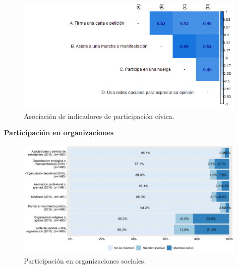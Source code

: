 \documentclass[
  12pt,
]{book}
\begin{document}
\begin{figure}[H]

{\centering \includegraphics[width=1\linewidth,height=1\textheight]{output/graphs/participacion-civica_cor} 

}

\caption{Asociación de indicadores de participación cívica.}\label{fig:participacion-civica-cor}
\end{figure}

\textbf{Participación en organizaciones}

\begin{figure}[H]

{\centering \includegraphics[width=1\linewidth,height=1\textheight]{output/graphs/participacion-organizaciones} 

}

\caption{Participación en organizaciones sociales.}\label{fig:participacion-organizaciones}
\end{figure}
\end{document}
